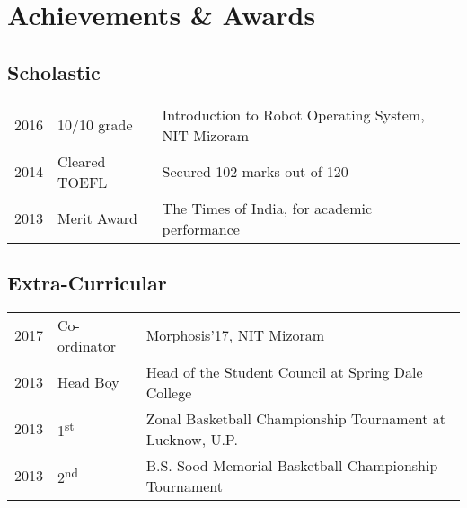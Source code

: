 
\section{Achievements \& Awards} 
\subsection{Scholastic}
\begin{tabular}{rll}
2016	     & 10/10 grade  & Introduction to Robot Operating System, NIT Mizoram\\
2014         & Cleared TOEFL  & Secured 102 marks out of 120 \\
2013         & Merit Award  & The Times of India, for academic performance \\
\end{tabular}
\sectionsep

\subsection{Extra-Curricular}
\begin{tabular}{rll}
2017         & Co-ordinator  & Morphosis'17, NIT Mizoram \\
2013         & Head Boy  & Head of the Student Council at Spring Dale College \\
2013         & 1\textsuperscript{st}  & Zonal Basketball Championship Tournament at Lucknow, U.P. \\
2013         & 2\textsuperscript{nd}  & B.S. Sood Memorial Basketball Championship Tournament \\
\end{tabular}
\sectionsep